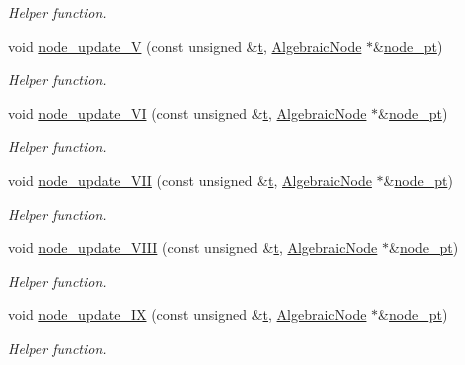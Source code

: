 \begin{DoxyCompactItemize}
\begin{DoxyCompactList}\small\item\em Helper function. \end{DoxyCompactList}\item 
void \hyperlink{classoomph_1_1AlgebraicCylinderWithFlagMesh_a035216f13c9758881ce2b7e33ad27926}{node\+\_\+update\+\_\+V} (const unsigned \&\hyperlink{cfortran_8h_af6f0bd3dc13317f895c91323c25c2b8f}{t}, \hyperlink{classoomph_1_1AlgebraicNode}{Algebraic\+Node} $\ast$\&\hyperlink{classoomph_1_1AlgebraicMesh_aedeebbe95d2f8e67e9939cecd1be3933}{node\+\_\+pt})
\begin{DoxyCompactList}\small\item\em Helper function. \end{DoxyCompactList}\item 
void \hyperlink{classoomph_1_1AlgebraicCylinderWithFlagMesh_a989fe557f03ac20812e69a8de2dbb9a4}{node\+\_\+update\+\_\+\+VI} (const unsigned \&\hyperlink{cfortran_8h_af6f0bd3dc13317f895c91323c25c2b8f}{t}, \hyperlink{classoomph_1_1AlgebraicNode}{Algebraic\+Node} $\ast$\&\hyperlink{classoomph_1_1AlgebraicMesh_aedeebbe95d2f8e67e9939cecd1be3933}{node\+\_\+pt})
\begin{DoxyCompactList}\small\item\em Helper function. \end{DoxyCompactList}\item 
void \hyperlink{classoomph_1_1AlgebraicCylinderWithFlagMesh_abb0565f0624583d2549f38602fd11e48}{node\+\_\+update\+\_\+\+V\+II} (const unsigned \&\hyperlink{cfortran_8h_af6f0bd3dc13317f895c91323c25c2b8f}{t}, \hyperlink{classoomph_1_1AlgebraicNode}{Algebraic\+Node} $\ast$\&\hyperlink{classoomph_1_1AlgebraicMesh_aedeebbe95d2f8e67e9939cecd1be3933}{node\+\_\+pt})
\begin{DoxyCompactList}\small\item\em Helper function. \end{DoxyCompactList}\item 
void \hyperlink{classoomph_1_1AlgebraicCylinderWithFlagMesh_a85336e587d9c4cac7f4d77890dd7690b}{node\+\_\+update\+\_\+\+V\+I\+II} (const unsigned \&\hyperlink{cfortran_8h_af6f0bd3dc13317f895c91323c25c2b8f}{t}, \hyperlink{classoomph_1_1AlgebraicNode}{Algebraic\+Node} $\ast$\&\hyperlink{classoomph_1_1AlgebraicMesh_aedeebbe95d2f8e67e9939cecd1be3933}{node\+\_\+pt})
\begin{DoxyCompactList}\small\item\em Helper function. \end{DoxyCompactList}\item 
void \hyperlink{classoomph_1_1AlgebraicCylinderWithFlagMesh_ae8e85400abd282b64463b67e21e9c13a}{node\+\_\+update\+\_\+\+IX} (const unsigned \&\hyperlink{cfortran_8h_af6f0bd3dc13317f895c91323c25c2b8f}{t}, \hyperlink{classoomph_1_1AlgebraicNode}{Algebraic\+Node} $\ast$\&\hyperlink{classoomph_1_1AlgebraicMesh_aedeebbe95d2f8e67e9939cecd1be3933}{node\+\_\+pt})
\begin{DoxyCompactList}\small\item\em Helper function. \end{DoxyCompactList}\end{DoxyCompactItemize}
